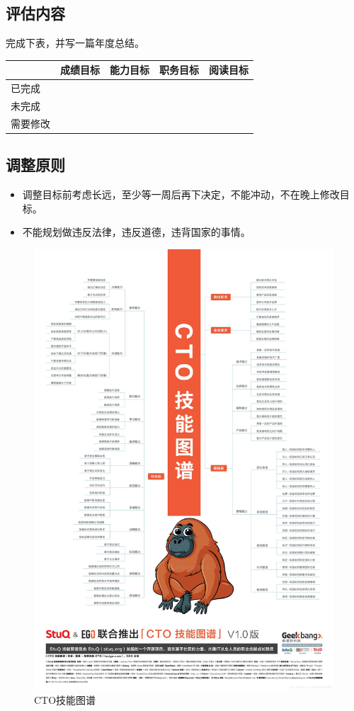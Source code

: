 \documentclass{article}
\begin{document}
\subsection{评估内容}
完成下表，并写一篇年度总结。\par
\begin{table}[h]
	\centering
	\begin{tabular}{|l|l|l|l|l|}
		\hline
		& \textbf{成绩目标} & \textbf{能力目标} & \textbf{职务目标} & \textbf{阅读目标} \\ \hline
		已完成  &               &               &               &               \\ \hline
		未完成  &               &               &               &               \\ \hline
		需要修改 &               &               &               &               \\ \hline
	\end{tabular}
\end{table}
\subsection{调整原则}
\begin{itemize}
	\item 调整目标前考虑长远，至少等一周后再下决定，不能冲动，不在晚上修改目标。
	\item 不能规划做违反法律，违反道德，违背国家的事情。
\end{itemize}
\begin{figure}[H]
	\centering
	\includegraphics[width=1\linewidth]{skillmap}
	\caption{CTO技能图谱}
	\label{fig:skillmap}
\end{figure}
\end{document}

